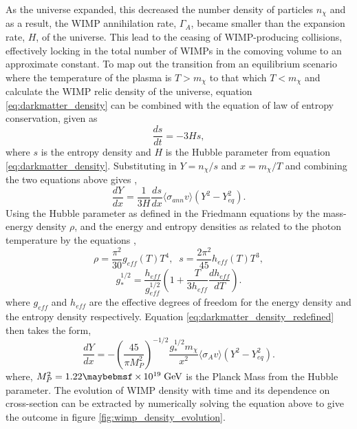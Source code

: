 As the universe expanded, this decreased the number density of particles $n_{\chi}$ and as a result, the WIMP annihilation rate, $\Gamma_{A}$, became smaller than the expansion rate, $H$, of the universe. This lead to the ceasing of WIMP-producing collisions, effectively locking in the total number of WIMPs in the comoving volume to an approximate constant. To map out the transition from an equilibrium scenario where the temperature of the plasma is $T > m_{\chi}$ to that which $T < m_{\chi}$ and calculate the WIMP relic density of the universe, equation \ref{eq:darkmatter_density} can be combined with the equation of law of entropy conservation, given as \cite{Bertone_book}
%
\begin{equation} \label{eq:darkmatter_entropy}
    \frac{ds}{dt} = -3Hs, 
\end{equation}
%
where $s$ is the entropy density and $H$ is the Hubble parameter from equation \ref{eq:darkmatter_density}. Substituting in $Y = n_{\chi}/s$ and $x = m_{\chi}/T$ and combining the two equations above gives \cite{Bertone_book}, 
%
\begin{equation} \label{eq:darkmatter_density_redefined}
    \frac{dY}{dx} = \frac{1}{3H}\frac{ds}{dx}\langle \sigma_{ann}v \rangle (Y^2 - Y^2_{eq}). 
\end{equation}
%
Using the Hubble parameter as defined in the Friedmann equations by the mass-energy density $\rho$, and the energy and entropy densities as related to the photon temperature by the equations \cite{Bertone_book}, 
%
\begin{equation} \label{eq:g_h_effective}
    \rho = \frac{\pi{}^2}{30}g_{eff}(T)T^4, \; \; s = \frac{2\pi{}^2}{45}h_{eff}(T)T^3,
\end{equation}
%
%
\begin{equation} \label{eq:g_h_effective}
    g^{1/2}_{\ast} = \frac{h_{eff}}{g^{1/2}_{eff}} \left(1 + \frac{T}{3h_{eff}} \frac{dh_{eff}}{dT} \right). 
\end{equation}
%
where $g_{eff}$ and $h_{eff}$ are the effective degrees of freedom for the energy density and the entropy density respectively. Equation \ref{eq:darkmatter_density_redefined} then takes the form,
%
\begin{equation} \label{eq:darkmatter_density_redefined}
    \frac{dY}{dx} = -\left(\frac{45}{\pi{}M^{2}_{P}} \right)^{-1/2}\frac{g_{\ast}^{1/2}m_{\chi}}{x^2}\langle \sigma_{A}v \rangle (Y^2 - Y^2_{eq}). 
\end{equation}
%
where, $M^{2}_{P} = 1.22 \times 10^{19} \; \MathText{GeV}$ is the Planck Mass from the Hubble parameter. The evolution of WIMP density with time and its dependence on cross-section can be extracted by numerically solving the equation above to give the outcome in figure \ref{fig:wimp_density_evolution}. 

